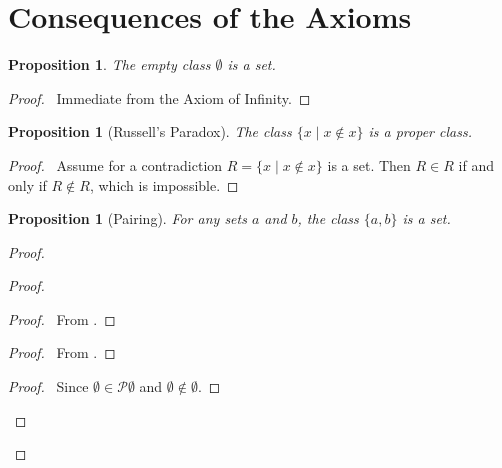 \documentclass{book}
\let\qed\relax
\newtheorem{prop}[ax]{Proposition}
\theoremstyle{definition}
\begin{document}
\section{Consequences of the Axioms}

\begin{prop}
The empty class $\emptyset$ is a set.
\end{prop}

\begin{proof}
\pf\ Immediate from the Axiom of Infinity. \qed
\end{proof}

\begin{prop}[Russell's Paradox]
The class $\{ x \mid x \notin x \}$ is a proper class.
\end{prop}

\begin{proof}
\pf\ Assume for a contradiction $R = \{ x \mid x \notin x \}$ is a set. Then $R \in R$ if and only if $R \notin R$, which is impossible. \qed
\end{proof}

\begin{prop}[Pairing]
For any sets $a$ and $b$, the class $\{a,b\}$ is a set.
\end{prop}

\begin{proof}
\pf
{}
\begin{proof}
	\begin{proof}
		\pf\ From .
	\end{proof}
	\begin{proof}
		\pf\ From .
	\end{proof}
	\begin{proof}
		\pf\ Since $\emptyset \in \mathcal{P} \emptyset$ and $\emptyset \notin \emptyset$.
	\end{proof}
\end{proof}
\qed
\end{proof}
\end{document}
